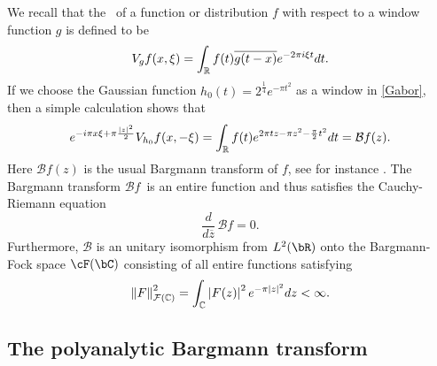 \documentclass[12pt]{amsart}
\theoremstyle{plain}
\numberwithin{equation}{section}
\begin{document}
We recall that the \stft\ of a function or distribution $f$ with respect to
a window function $g$ is defined to be 
\begin{equation}
V_{g}f(x,\xi )=\int_{%
\mathbb{R}
}f(t)\overline{g(t-x)}e^{-2\pi i\xi t}dt.  \label{Gabor}
\end{equation}%
If we choose the Gaussian function $h_{0}(t)=2^{\frac{1}{4}}e^{-\pi t^{2}}$
as a window in \eqref{Gabor}, then a simple calculation shows that 
\begin{equation}
e^{-i\pi x\xi +\pi \frac{\left\vert z\right\vert ^{2}}{2}}V_{h_{0}}f(x,-\xi
)=\int_{%
\mathbb{R}
}f(t)e^{2\pi tz-\pi z^{2}-\frac{\pi }{2}t^{2}}dt=\mathcal{B}f(z)\text{.}
\label{Bargmann}
\end{equation}%
Here $\mathcal{B}f (z)$ is the usual Bargmann transform of $f$, see for
instance \cite{folland89}. The Bargmann transform $\mathcal{B}f$\ is an
entire function and thus satisfies the Cauchy-Riemann equation 
\begin{equation*}
\frac{d}{d\overline{z}}\, \mathcal{B}f=0\text{.}
\end{equation*}%
Furthermore, $\mathcal{B}$ is an unitary isomorphism from $L^{2}(\bR )$ onto
the Bargmann-Fock space $\cF (\bC )$ consisting of all entire functions
satisfying 
\begin{equation}
\left\Vert F\right\Vert _{\mathcal{F}(%
\mathbb{C}
)}^{2}=\int_{%
\mathbb{C}
}\left\vert F(z)\right\vert ^{2}e^{-\pi \left\vert z\right\vert
^{2}}dz<\infty .  \label{Focknorm}
\end{equation}

\subsection{The polyanalytic Bargmann transform}
\end{document}
